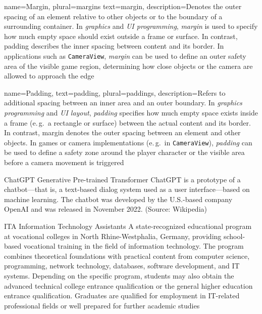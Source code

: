 {
	name={Margin},
	plural={margins}
	text={margin},
	description={Denotes the outer spacing of an element relative to other objects or to the boundary of a surrounding container. In \textit{graphics} and \textit{UI programming}, \emph{margin} is used to specify how much empty space should exist outside a frame or surface. In contrast, \gls{padding} describes the inner spacing between content and its border. In applications such as \texttt{CameraView}, \emph{margin} can be used to define an outer safety area of the visible game region, determining how close objects or the camera are allowed to approach the edge}
}

{
	name={Padding},
	text={padding},
	plural={paddings},
	description={Refers to additional spacing between an inner area and an outer boundary. In \textit{graphics programming} and \textit{UI layout}, \emph{padding} specifies how much empty space exists inside a frame (e.\,g.\ a rectangle or surface) between the actual content and its border. In contrast, \gls{margin} denotes the outer spacing between an element and other objects. In games or camera implementations (e.\,g.\ in \texttt{CameraView}), \emph{padding} can be used to define a safety zone around the player character or the visible area before a camera movement is triggered}
}


	{ChatGPT}
	{Generative Pre-trained Transformer}  %
	{ChatGPT is a prototype of a chatbot—that is, a text-based dialog system used as a user interface—based on machine learning. The chatbot was developed by the U.S.-based company OpenAI and was released in November 2022. (Source: Wikipedia)}

	{ITA}
	{Information Technology Assistants}
	{A state-recognized educational program at vocational colleges in North Rhine-Westphalia, Germany, providing school-based vocational training in the field of information technology. The program combines theoretical foundations with practical content from computer science, programming, network technology, databases, software development, and IT systems. Depending on the specific program, students may also obtain the advanced technical college entrance qualification or the general higher education entrance qualification. Graduates are qualified for employment in IT-related professional fields or well prepared for further academic studies}

